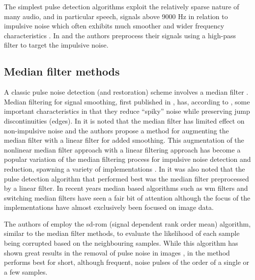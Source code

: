 The simplest pulse detection algorithms exploit the relatively sparse nature of many audio, and in particular speech, signals above 9000 Hz in relation to impulsive noise which often exhibits much smoother and wider frequency characteristics \cite{Subramanya2007}. In \cite{Kasparis1993} and \cite{US6795559} the authors preprocess their signals using a high-pass filter to target the impulsive noise.

\subsection{Median filter methods}\label{sec:LitRevDetMedianFilts}
A classic pulse noise detection (and restoration) scheme involves a median filter \cite{Tukey1974}\linebreak[2]\cite{Lee1985}\cite{Heinonen1985}\cite{Heinonen1987}\cite{Maekivirta1991}\cite{Kasparis1993}.
Median filtering for signal smoothing, first published in \cite{Tukey1974}, has, according to \cite{Brillinger2002}, some important characteristics in that they reduce ``spiky'' noise while preserving jump discontinuities (edges). In \cite{Lee1985} it is noted that the median filter has limited effect on non-impulsive noise and the authors propose a method for augmenting the median filter with a linear filter for added smoothing. This augmentation of the nonlinear median filter approach with a linear filtering approach has become a popular variation of the median filtering process for impulsive noise detection and reduction, spawning a variety of implementations \cite{Lee1985}\cite{Heinonen1985}\cite{Nieminen1987}\cite{Kasparis1993}\cite{Loveridge1995}. In \cite{Kauppinen2002} it was also noted that the pulse detection algorithm that performed best was the median filter preprocessed by a linear filter. In recent years median based algorithms such as \gls{wm} filters \cite{Yin1996}\cite{Wang2010} and switching median filters \cite{Abreu1996}\cite{Chen2000}\cite{Chen2001}\cite{Lin2007} have seen a fair bit of attention although the focus of the implementations have almost exclusively been focused on image data.

The authors of \cite{Chandra1998} employ the \gls{sd-rom} (signal dependent rank order mean) algorithm, similar to the median filter methods, to evaluate the likelihood of each sample being corrupted based on the neighbouring samples. While this algorithm has shown great results in the removal of pulse noise in images \cite{Abreu1996}, in \cite{Chandra1998} the method performs best for short, although frequent, noise pulses of the order of a single or a few samples.

